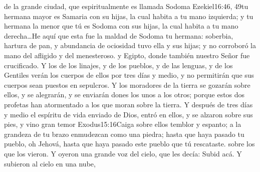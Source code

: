  de la grande ciudad,%
 que espiritualmente es llamada Sodoma%
				   {Ezekiel}{16:46, 49}{tu hermana mayor es Samaria con su hijas, la cual habita a tu mano izquierda; y tu hermana la menor que tú es Sodoma con sus hijas, la cual habita a tu mano derecha\ldots He aquí que esta fue la maldad de Sodoma tu hermana: soberbia, hartura de pan, y abundancia de ociosidad tuvo ella y sus hijas; y no corroboró la mano del afligido y del menesteroso.}
 y Egipto,%
 donde también nuestro Señor fue crucificado.
Y los de los linajes, y de los pueblos, y de las lenguas, y de los Gentiles verán los cuerpos de ellos por tres días y medio, y no permitirán que sus cuerpos sean puestos en sepulcros. 
Y los moradores de la tierra se gozarán sobre ellos, y se alegrarán, y se enviarán dones los unos a los otros; porque estos dos profetas han atormentado a los que moran sobre la tierra.%
Y después de tres días y medio el espíritu de vida enviado de Dios, entró en ellos,%
 y se alzaron sobre sus pies,%
 y vino gran temor%
				  {Exodus}{15:16}{Caiga sobre ellos temblor y espanto; a la grandeza de tu brazo enmudezcan como una piedra; hasta que haya pasado tu pueblo, oh Jehová, hasta que haya pasado este pueblo que tú rescataste.} %
 sobre los que los vieron. 
Y oyeron una grande voz del cielo, que les decía: Subid acá. Y subieron al cielo en una nube,%
